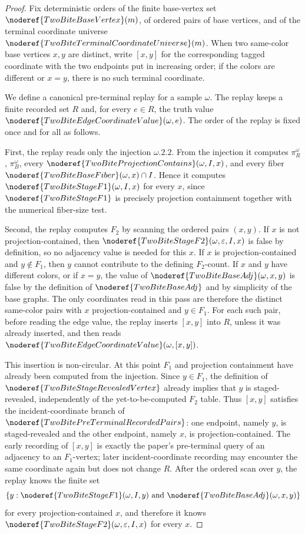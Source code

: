 \begin{proof}
Fix deterministic orders of the finite base-vertex set
\(\noderef{TwoBiteBaseVertex}(m)\), of ordered pairs of base vertices, and of
the terminal coordinate universe
\(\noderef{TwoBiteTerminalCoordinateUniverse}(m)\).  When two same-color base
vertices \(x,y\) are distinct, write \([x,y]\) for the corresponding tagged
coordinate with the two endpoints put in increasing order; if the colors are
different or \(x=y\), there is no such terminal coordinate.

We define a canonical pre-terminal replay for a sample \(\omega\).  The replay
keeps a finite recorded set \(R\) and, for every \(e\in R\), the truth value
\(\noderef{TwoBiteEdgeCoordinateValue}(\omega,e)\).  The order of the replay
is fixed once and for all as follows.

First, the replay reads only the injection \(\omega.2.2\).  From the injection
it computes \(\pi_R^\omega\), \(\pi_B^\omega\), every
\(\noderef{TwoBiteProjectionContains}(\omega,I,x)\), and every fiber
\(\noderef{TwoBiteBaseFiber}(\omega,x)\cap I\).  Hence it computes
\(\noderef{TwoBiteStageF1}(\omega,I,x)\) for every \(x\), since
\(\noderef{TwoBiteStageF1}\) is precisely projection containment together with
the numerical fiber-size test.

Second, the replay computes \(F_2\) by scanning the ordered pairs \((x,y)\).
If \(x\) is not projection-contained, then
\(\noderef{TwoBiteStageF2}(\omega,\varepsilon,I,x)\) is false by definition,
so no adjacency value is needed for this \(x\).  If \(x\) is
projection-contained and \(y\notin F_1\), then \(y\) cannot contribute to the
defining \(F_2\)-count.  If \(x\) and \(y\) have different colors, or if
\(x=y\), the value of \(\noderef{TwoBiteBaseAdj}(\omega,x,y)\) is false by
the definition of \(\noderef{TwoBiteBaseAdj}\) and by simplicity of the base
graphs.  The only coordinates read in this pass are therefore the distinct
same-color pairs with \(x\) projection-contained and \(y\in F_1\).  For each
such pair, before reading the edge value, the replay inserts \([x,y]\) into
\(R\), unless it was already inserted, and then reads
\(\noderef{TwoBiteEdgeCoordinateValue}(\omega,[x,y])\).

This insertion is non-circular.  At this point \(F_1\) and projection
containment have already been computed from the injection.  Since
\(y\in F_1\), the definition of
\(\noderef{TwoBiteStageRevealedVertex}\) already implies that \(y\) is
staged-revealed, independently of the yet-to-be-computed \(F_2\) table.  Thus
\([x,y]\) satisfies the incident-coordinate branch of
\(\noderef{TwoBitePreTerminalRecordedPairs}\): one endpoint, namely \(y\), is
staged-revealed and the other endpoint, namely \(x\), is
projection-contained.  The early recording of \([x,y]\) is exactly the
paper's pre-terminal query of an adjacency to an \(F_1\)-vertex; later
incident-coordinate recording may encounter the same coordinate again but
does not change \(R\).  After the ordered scan over \(y\), the replay knows
the finite set
\[
\{y:\noderef{TwoBiteStageF1}(\omega,I,y)
       \text{ and }\noderef{TwoBiteBaseAdj}(\omega,x,y)\}
\]
for every projection-contained \(x\), and therefore it knows
\(\noderef{TwoBiteStageF2}(\omega,\varepsilon,I,x)\) for every \(x\).


\end{proof}
